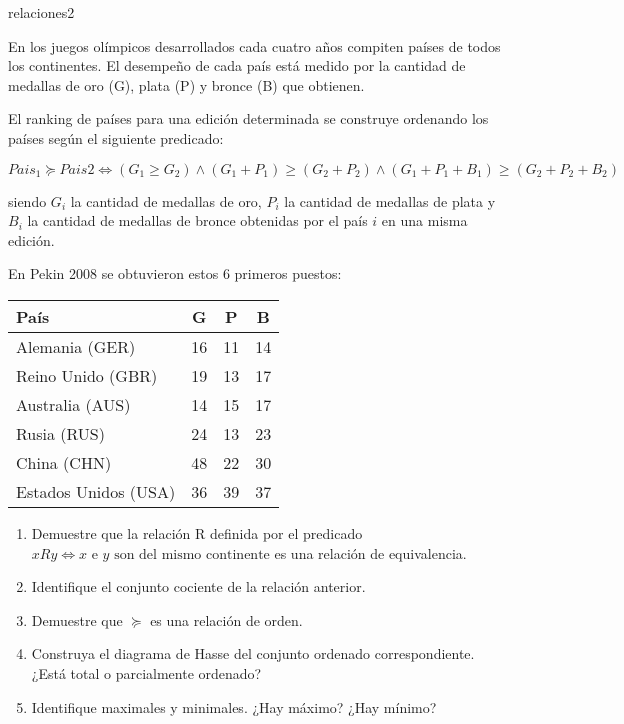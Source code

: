 \begin{defproblem}{relaciones2}%
	\begin{onlyproblem}%
		En los juegos olímpicos desarrollados cada cuatro años compiten países de todos los continentes. El desempeño de cada país está medido por la cantidad de medallas de oro (G), plata (P) y bronce (B) que obtienen.
		
		El ranking de países para una edición determinada se construye ordenando los países según el siguiente predicado:
		
		\[ Pais_1 \succeq Pais2 \Leftrightarrow (G_1 \ge G_2) \land (G_1 + P_1) \ge (G_2 + P_2) \land (G_1+P_1+B_1) \ge (G_2+P_2+B_2) \]
		
		siendo $ G_i $ la cantidad de medallas de oro, $ P_i $ la cantidad de medallas de plata y $ B_i $ la cantidad de medallas de bronce obtenidas por el país $ i $ en una misma edición.
		
		En Pekin 2008 se obtuvieron estos 6 primeros puestos: 
		
		\begin{tabular}{|lccc|}
			\hline
			País & G & P & B \\
			\hline
			Alemania (GER)  & 16 & 11 & 14 \\
			Reino Unido (GBR)  & 19 & 13 & 17 \\
			Australia (AUS)  & 14 & 15 & 17 \\
			Rusia (RUS)  & 24 & 13 & 23 \\
			China (CHN)  & 48 & 22 & 30 \\
			Estados Unidos (USA)  & 36 & 39 & 37 \\
			\hline
		\end{tabular}
	
		\begin{enumerate}
			\item Demuestre que la relación R definida por el predicado $ x R y \Leftrightarrow x \text{ e } y \text{ son del mismo continente} $ es una relación de equivalencia.
			\item Identifique el conjunto cociente de la relación anterior.
			\item Demuestre que $ \succeq $ es una relación de orden.
			\item Construya el diagrama de Hasse del conjunto ordenado correspondiente. ¿Está total o parcialmente ordenado?
			\item Identifique maximales y minimales. ¿Hay máximo? ¿Hay mínimo?
		\end{enumerate}
		
	\end{onlyproblem}%
	\begin{onlysolution}%
		
	\end{onlysolution}%
\end{defproblem}

